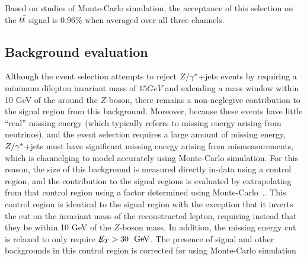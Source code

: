 Based on studies of Monte-Carlo simulation, the acceptance of this selection
on the $t\bar{t}$ signal is 0.96\% when averaged over all three channels.



\subsection{Background evaluation}
\label{s:backgrounds}

Although the event selection attempts to reject $Z/\gamma^{*}$+jets events by requiring a minimum dilepton invariant mass of $15 GeV$ and exlcuding a
mass window within 10 GeV of the around the $Z$-boson, there remains a non-neglegive contribution to the signal region from this background.
Moreover, because these events have little ``real'' missing energy (which typically referrs to missing energy arising from neutrinos),
and the event selection requires a large amount of missing energy, $Z/\gamma^{*}$+jets must have significant missing energy arising
from mismeasurements, which is channelging to model accurately using Monte-Carlo simulation.
For this reason, the size of this background is measured directly in-data using a control region, and the  contribution to the signal regions
is evaluated by extrapolating from that control region using a factor determined using Monte-Carlo~\cite{ATL-CONF-2011-034}..
This control region is identical to the signal region with the exception that it inverts the cut on the invariant mass of the reconstructed
lepton, requiring instead that they be within 10 GeV of the $Z$-boson mass.
In addition, the missing energy cut is relaxed to only require $\met>30~\GeV$.
The presence of signal and other backgrounds in this control region is corrected for using
Monte-Carlo simulation




